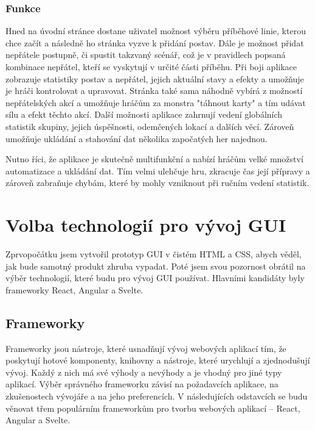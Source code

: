 \subsubsection*{Funkce}
Hned na úvodní stránce dostane uživatel možnost výběru příběhové linie, kterou chce začít a následně ho stránka vyzve k přidání postav. Dále je možnost přidat nepřátele postupně, či spustit takzvaný scénář, což je v pravidlech popsaná kombinace nepřátel, kteří se vyskytují v určité části příběhu. Při boji aplikace zobrazuje statistiky postav a nepřátel, jejich aktuální stavy a efekty a umožňuje je hráči kontrolovat a upravovat. Stránka také sama náhodně vybírá z možností nepřátelských akcí a umožňuje hráčům za monstra "táhnout karty" a tím udávat sílu a efekt těchto akcí. Další možnosti aplikace zahrnují vedení globálních statistik skupiny, jejich úspěšnosti, odemčených lokací a dalších věcí. Zároveň umožňuje ukládání a stahování dat několika započatých her najednou.

Nutno říci, že aplikace je skutečně multifunkční a nabízí hráčům velké množství automatizace a ukládání dat. Tím velmi ulehčuje hru, zkracuje čas její přípravy a zároveň zabraňuje chybám, které by mohly vzniknout při ručním vedení statistik.

\section{Volba technologií pro vývoj GUI}
Zprvopočátku jsem vytvořil prototyp GUI v čistém HTML a CSS, abych věděl, jak bude samotný produkt zhruba vypadat. Poté jsem svou pozornost obrátil na výběr technologií, které budu pro vývoj GUI používat. Hlavními kandidáty byly frameworky React, Angular a Svelte.

\subsection{Frameworky}
Frameworky jsou nástroje, které usnadňují vývoj webových aplikací tím, že poskytují hotové komponenty, knihovny a nástroje, které urychlují a zjednodušují vývoj. Každý z nich má své výhody a nevýhody a je vhodný pro jiné typy aplikací. Výběr správného frameworku závisí na požadavcích aplikace, na zkušenostech vývojáře a na jeho preferencích. V následujících odstavcích se budu věnovat třem populárním frameworkům pro tvorbu webových aplikací -- React, Angular a Svelte.

